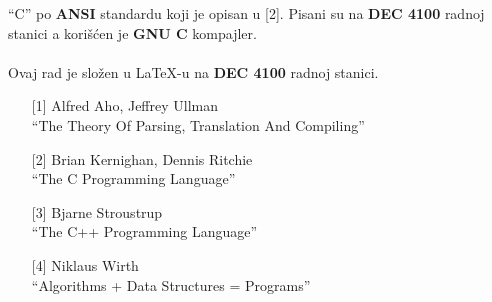     ``C'' po {\bf ANSI} standardu koji je opisan u [2].
    Pisani su na {\bf DEC 4100} radnoj stanici a kori\v s\'cen je
    {\bf GNU C} kompajler.\\
    \\
    Ovaj rad je slo\v zen u \LaTeX-u na {\bf DEC 4100} radnoj stanici.
%
%
  \begin{itemize}
    \item[{[1]}]
    {
      Alfred Aho, Jeffrey Ullman\\
      ``The Theory Of Parsing, Translation And Compiling''
    }
    \item[{[2]}]
    {
      Brian Kernighan, Dennis Ritchie\\
      ``The C Programming Language''
    }
    \item[{[3]}]
    {
      Bjarne Stroustrup\\
      ``The C++ Programming Language''
    }
    \item[{[4]}]
    {
      Niklaus Wirth\\
      ``Algorithms + Data Structures = Programs''
    }
  \end{itemize}
%
%

